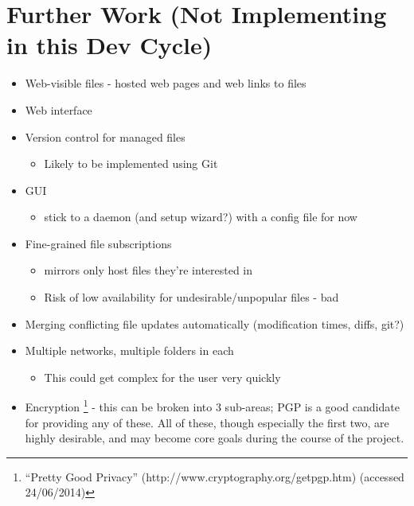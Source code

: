\documentclass[12pt,a4paper,]{adreport}
\begin{document}
\chapter{Further Work (Not Implementing in this Dev
Cycle)}\label{further-work-not-implementing-in-this-dev-cycle}

\begin{itemize}
\itemsep1pt\parskip0pt
\item
  Web-visible files - hosted web pages and web links to files
\item
  Web interface
\item
  Version control for managed files

  \begin{itemize}
  \itemsep1pt\parskip0pt
  \item
    Likely to be implemented using Git
  \end{itemize}
\item
  GUI

  \begin{itemize}
  \itemsep1pt\parskip0pt
  \item
    stick to a daemon (and setup wizard?) with a config file for now
  \end{itemize}
\item
  Fine-grained file subscriptions

  \begin{itemize}
  \itemsep1pt\parskip0pt
  \item
    mirrors only host files they're interested in
  \item
    Risk of low availability for undesirable/unpopular files - bad
  \end{itemize}
\item
  Merging conflicting file updates automatically (modification times,
  diffs, git?)
\item
  Multiple networks, multiple folders in each

  \begin{itemize}
  \itemsep1pt\parskip0pt
  \item
    This could get complex for the user very quickly
  \end{itemize}
\item
  Encryption \footnote{``Pretty Good Privacy''
    (http://www.cryptography.org/getpgp.htm) (accessed 24/06/2014)} -
  this can be broken into 3 sub-areas; PGP is a good candidate for
  providing any of these. All of these, though especially the first two,
  are highly desirable, and may become core goals during the course of
  the project.


\end{itemize}
\end{document}
